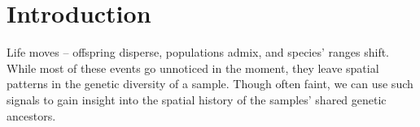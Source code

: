 \section{Introduction}

Life moves -- offspring disperse, populations admix, and species' ranges shift. While most of these events go unnoticed in the moment, they leave spatial patterns in the genetic diversity of a sample. Though often faint, we can use such signals to gain insight into the spatial history of the samples' shared genetic ancestors. 



